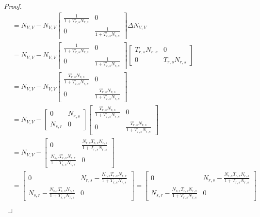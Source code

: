 \begin{proof}
\begin{align*}
        &= N_{V, V} - N_{V, V} \begin{bmatrix} \frac{1}{1 + T_{r, s} N_{r, s}} & 0 \\ 0 & \frac{1}{1 + T_{r, s} N_{r, s}} \end{bmatrix} \Delta N_{V, V} \\
        &= N_{V, V} - N_{V, V} \begin{bmatrix} \frac{1}{1 + T_{r, s} N_{r, s}} & 0 \\ 0 & \frac{1}{1 + T_{r, s} N_{r, s}} \end{bmatrix} \begin{bmatrix} T_{r, s} N_{r, s} & 0 \\ 0 & T_{r, s} N_{r, s} \end{bmatrix} \\
        &= N_{V, V} - N_{V, V} \begin{bmatrix} \frac{T_{r, s} N_{r, s}}{1 + T_{r, s} N_{r, s}} & 0 \\ 0 & \frac{T_{r, s} N_{r, s}}{1 + T_{r, s} N_{r, s}} \end{bmatrix} \\
        &= N_{V, V} - \begin{bmatrix} 0 & N_{r, s} \\ N_{s, r} & 0 \end{bmatrix} \begin{bmatrix} \frac{T_{r, s} N_{r, s}}{1 + T_{r, s} N_{r, s}} & 0 \\ 0 & \frac{T_{r, s} N_{r, s}}{1 + T_{r, s} N_{r, s}} \end{bmatrix} \\
        &= N_{V, V} - \begin{bmatrix} 0 & \frac{N_{r, s} T_{r, s} N_{r, s}}{1 + T_{r, s} N_{r, s}} \\ \frac{N_{s, r} T_{r, s} N_{r, s}}{1 + T_{r, s} N_{r, s}} & 0 \end{bmatrix} \\
        &= \begin{bmatrix} 0 & N_{r, s} - \frac{N_{r, s} T_{r, s} N_{r, s}}{1 + T_{r, s} N_{r, s}} \\ N_{s, r} - \frac{N_{s, r} T_{r, s} N_{r, s}}{1 + T_{r, s} N_{r, s}} & 0 \end{bmatrix} 
        = \begin{bmatrix} 0 & N_{r, s} - \frac{N_{r, s} T_{r, s} N_{r, s}}{1 + T_{r, s} N_{r, s}} \\ N_{s, r} - \frac{N_{s, r} T_{r, s} N_{r, s}}{1 + T_{r, s} N_{r, s}} & 0 \end{bmatrix} \\
    \end{align*}
\end{proof}

